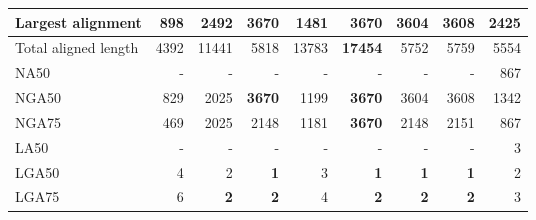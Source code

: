 \documentclass[12pt,a4paper]{article}
\begin{document}
\begin{table}[ht]
\begin{center}
\begin{tabular}{|l*{8}{|r}|}
Largest alignment & 898 & 2492 & {\bf 3670} & 1481 & {\bf 3670} & 3604 & 3608 & 2425 \\ \hline
Total aligned length & 4392 & 11441 & 5818 & 13783 & {\bf 17454} & 5752 & 5759 & 5554 \\ \hline
NA50 & - & - & - & - & - & - & - & 867 \\ \hline
NGA50 & 829 & 2025 & {\bf 3670} & 1199 & {\bf 3670} & 3604 & 3608 & 1342 \\ \hline
NGA75 & 469 & 2025 & 2148 & 1181 & {\bf 3670} & 2148 & 2151 & 867 \\ \hline
LA50 & - & - & - & - & - & - & - & 3 \\ \hline
LGA50 & 4 & 2 & {\bf 1} & 3 & {\bf 1} & {\bf 1} & {\bf 1} & 2 \\ \hline
LGA75 & 6 & {\bf 2} & {\bf 2} & 4 & {\bf 2} & {\bf 2} & {\bf 2} & 3 \\ \hline
\end{tabular}
\end{center}
\end{table}
\end{document}
